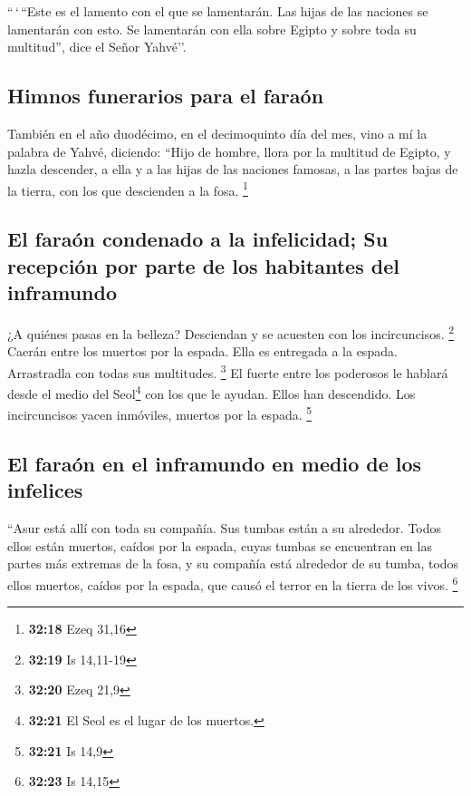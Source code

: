 \begin{paracol}{2}
 ``\,`\,``Este es el lamento con el que se lamentarán.
Las hijas de las naciones se lamentarán con esto. Se lamentarán con ella
sobre Egipto y sobre toda su multitud'', dice el Señor Yahvé''.

\hypertarget{himnos-funerarios-para-el-farauxf3n}{%
\subsection{Himnos funerarios para el
faraón}\label{himnos-funerarios-para-el-farauxf3n}}

 También en el año duodécimo, en el decimoquinto día del
mes, vino a mí la palabra de Yahvé, diciendo:  ``Hijo de
hombre, llora por la multitud de Egipto, y hazla descender, a ella y a
las hijas de las naciones famosas, a las partes bajas de la tierra, con
los que descienden a la fosa. \footnote{\textbf{32:18} Ezeq 31,16}

\hypertarget{el-farauxf3n-condenado-a-la-infelicidad-su-recepciuxf3n-por-parte-de-los-habitantes-del-inframundo}{%
\subsection{El faraón condenado a la infelicidad; Su recepción por parte
de los habitantes del
inframundo}\label{el-farauxf3n-condenado-a-la-infelicidad-su-recepciuxf3n-por-parte-de-los-habitantes-del-inframundo}}

 ¿A quiénes pasas en la belleza? Desciendan y se acuesten
con los incircuncisos. \footnote{\textbf{32:19} Is 14,11-19}
 Caerán entre los muertos por la espada. Ella es
entregada a la espada. Arrastradla con todas sus multitudes. \footnote{\textbf{32:20}
  Ezeq 21,9}  El fuerte entre los poderosos le hablará
desde el medio del Seol\footnote{\textbf{32:21} El Seol es el lugar de
  los muertos.} con los que le ayudan. Ellos han descendido. Los
incircuncisos yacen inmóviles, muertos por la espada. \footnote{\textbf{32:21}
  Is 14,9}

\hypertarget{el-farauxf3n-en-el-inframundo-en-medio-de-los-infelices}{%
\subsection{El faraón en el inframundo en medio de los
infelices}\label{el-farauxf3n-en-el-inframundo-en-medio-de-los-infelices}}

 ``Asur está allí con toda su compañía. Sus tumbas están
a su alrededor. Todos ellos están muertos, caídos por la espada,
 cuyas tumbas se encuentran en las partes más extremas de
la fosa, y su compañía está alrededor de su tumba, todos ellos muertos,
caídos por la espada, que causó el terror en la tierra de los vivos.
\footnote{\textbf{32:23} Is 14,15}


\end{paracol}
